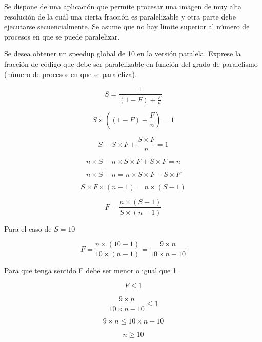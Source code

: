 \begin{acexercise}\end{acexercise}

Se dispone de una aplicación que permite procesar una imagen de muy alta
resolución de la cuál una cierta fracción es paralelizable y otra parte debe
ejecutarse secuencialmente. Se asume que no hay límite superior al número de
procesos en que se puede paralelizar.

Se desea obtener un speedup global de 10 en la versión paralela.  Exprese la
fracción de código que debe ser paralelizable en función del grado de
paralelismo (número de procesos en que se paraleliza).


\begin{acsolution}\end{acsolution}

\[
S = \frac{1}{\left(1 - F \right) + \displaystyle \frac{F}{n} }
\]

\[
S \times \left( (1-F) + \frac{F}{n} \right) = 1
\]

\[
S - S \times F + \frac{S \times F}{n} = 1
\]

\[
n \times S - n \times S \times F + S \times F = n
\]

\[
n \times S - n = n \times S \times F - S \times F
\]

\[
S \times F \times \left( n - 1 \right) = n \times \left( S - 1 \right)
\]

\[
F = \frac{n \times (S-1)}{S \times(n-1)}
\]

Para el caso de $S = 10$

\[
F = \frac{n \times (10-1)}{10 \times (n-1)} = 
\frac{9 \times n}{10 \times n - 10}
\]

Para que tenga sentido F debe ser menor o igual que 1. 

\[
F \leq 1
\]

\[
\frac{9 \times n}{10 \times n -10} \leq 1
\]

\[
9 \times n \leq 10 \times n-10
\]

\[
n \geq 10
\]


